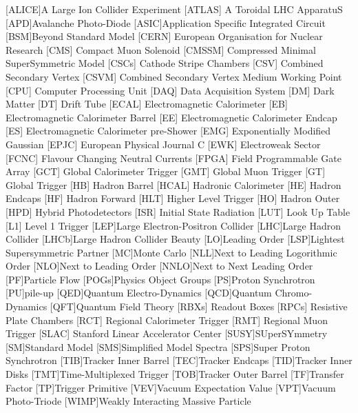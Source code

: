 \begin{acronym}[AAAAAAA]
[ALICE]{A Large Ion Collider Experiment}
 [ATLAS] {A Toroidal LHC ApparatuS}
[APD]{Avalanche Photo-Diode}
[ASIC]{Application Specific Integrated Circuit}
[BSM]{Beyond Standard Model}
 [CERN] {European Organisation for Nuclear Research}
 [CMS] {Compact Muon Solenoid}
 [CMSSM] {Compressed Minimal SuperSymmetric Model}
 [CSCs] {Cathode Stripe Chambers}
 [CSV] {Combined Secondary Vertex}
 [CSVM] {Combined Secondary Vertex Medium Working Point}
 [CPU] {Computer Processing Unit}
 [DAQ] {Data Acquisition System}
 [DM] {Dark Matter}
 [DT] {Drift Tube}
 [ECAL] {Electromagnetic Calorimeter}
 [EB] {Electromagnetic Calorimeter Barrel}
 [EE] {Electromagnetic Calorimeter Endcap}
 [ES] {Electromagnetic Calorimeter pre-Shower}
 [EMG] {Exponentially Modified Gaussian}
 [EPJC] {European Physical Journal C}
 [EWK] {Electroweak Sector}
 [FCNC] {Flavour Changing Neutral Currents}
 [FPGA] {Field Programmable Gate Array}
 [GCT] {Global Calorimeter Trigger}
 [GMT] {Global Muon Trigger}
 [GT] {Global Trigger}
 [HB] {Hadron Barrel}
 [HCAL] {Hadronic Calorimeter}
 [HE] {Hadron Endcaps}
 [HF] {Hadron Forward}
[HLT] {Higher Level Trigger}
 [HO] {Hadron Outer}
 [HPD] {Hybrid Photodetectors}
 [ISR] {Initial State Radiation}
 [LUT] {Look Up Table}
 [L1] {Level 1 Trigger}
[LEP]{Large Electron-Positron Collider}
[LHC]{Large Hadron Collider}
[LHCb]{Large Hadron Collider Beauty}
[LO]{Leading Order}
[LSP]{Lightest Supersymmetric Partner}
[MC]{Monte Carlo}
[NLL]{Next to Leading Logorithmic Order}
[NLO]{Next to Leading Order}
[NNLO]{Next to Next Leading Order}
[PF]{Particle Flow}
[POGs]{Physics Object Groups}
[PS]{Proton Synchrotron}
[PU]{pile-up}
[QED]{Quantum Electro-Dynamics}
[QCD]{Quantum Chromo-Dynamics}
[QFT]{Quantum Field Theory}
 [RBXs] {Readout Boxes}
 [RPCs] {Resistive Plate Chambers}
 [RCT] {Regional Calorimeter Trigger}
 [RMT] {Regional Muon Trigger}
 [SLAC] {Stanford Linear Accelerator Center}
[SUSY]{SUperSYmmetry}
[SM]{Standard Model}
[SMS]{Simplified Model Spectra}
[SPS]{Super Proton Synchrotron}
[TIB]{Tracker Inner Barrel} 
[TEC]{Tracker Endcaps} 
[TID]{Tracker Inner Disks}
[TMT]{Time-Multiplexed Trigger}
[TOB]{Tracker Outer Barrel} 
[TF]{Transfer Factor}
[TP]{Trigger Primitive}
[VEV]{Vacuum Expectation Value}
[VPT]{Vacuum Photo-Triode}
[WIMP]{Weakly Interacting Massive Particle}

\end{acronym}

